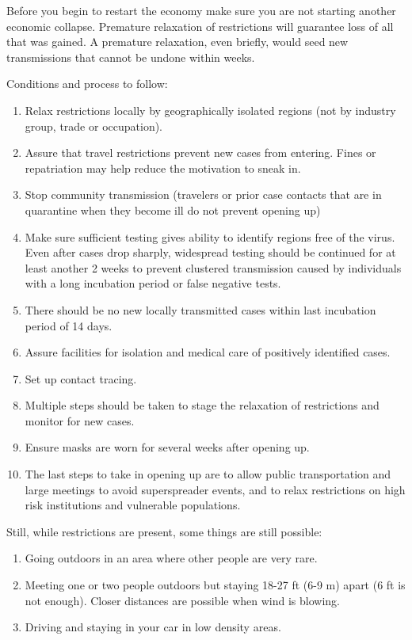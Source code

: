 \documentclass[onecolumn,journal]{IEEEtran}
\begin{document}
\large
\begin{multicols}{2}

Before you begin to restart the economy make sure you are not starting another economic collapse. Premature relaxation of restrictions will guarantee loss of all that was gained. A premature relaxation, even briefly, would seed new transmissions that cannot be undone within weeks.

Conditions and process to follow:
\begin{enumerate}
\item Relax restrictions locally by geographically isolated regions (not by industry group, trade or occupation).
\item Assure that travel restrictions prevent new cases from entering.  Fines or repatriation may help reduce the motivation to sneak in.
\item Stop community transmission (travelers or prior case contacts that are in quarantine when they become ill do not prevent opening up)
\item Make sure sufficient testing gives ability to identify regions free of the virus. Even after cases drop sharply, widespread testing should be continued for at least another 2 weeks to prevent clustered transmission caused by individuals with a long incubation period or false negative tests.
\item There should be no new locally transmitted cases within last incubation period of 14 days.
\item Assure facilities for isolation and medical care of positively identified cases.
\item Set up contact tracing.
\item Multiple steps should be taken to stage the relaxation of restrictions and monitor for new cases.
\item Ensure masks are worn for several weeks after opening up.
\item The last steps to take in opening up are to allow public transportation and large meetings to avoid superspreader events, and to relax restrictions on high risk institutions and vulnerable populations.
\end{enumerate}

Still, while restrictions are present, some things are still possible:
\begin{enumerate}
\item Going outdoors in an area where other people are very rare.
\item Meeting one or two people outdoors but staying 18-27 ft (6-9 m) apart (6 ft is not enough). Closer distances are possible when wind is blowing.
\item Driving and staying in your car in low density areas.
\end{enumerate}


\end{multicols}
\end{document}
